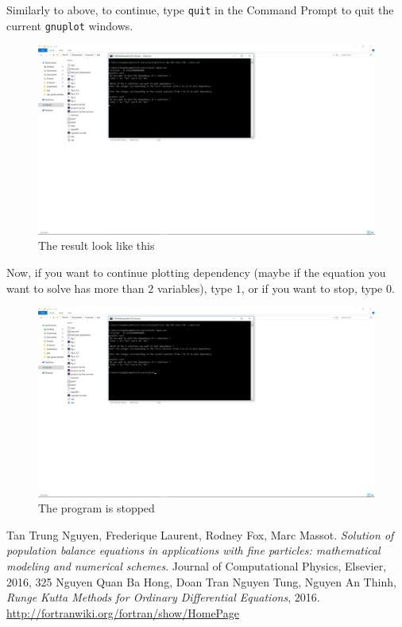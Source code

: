 \documentclass{article}
\begin{document}
	\noindent Similarly to above, to continue, type \texttt{quit} in the Command Prompt to quit the current \texttt{gnuplot} windows.
	\begin{figure}[H]
		\centering	\includegraphics[width=15cm]{fig101}
		\caption{The result look like this}
	\end{figure}
	\noindent Now, if you want to continue plotting dependency (maybe if the equation you want to solve has more than $2$ variables), type $1$, or if you want to stop, type $0$.
	\begin{figure}[H]
		\centering	\includegraphics[width=15cm]{fig11}
		\caption{The program is stopped}
	\end{figure}
\newpage
\begin{thebibliography}{999}
	 Tan Trung Nguyen, Frederique Laurent, Rodney Fox, Marc Massot. \textit{Solution of population balance equations in applications with fine particles: mathematical modeling and numerical schemes}. Journal of Computational Physics, Elsevier, 2016, 325
	 Nguyen Quan Ba Hong, Doan Tran Nguyen Tung, Nguyen An Thinh, \textit{Runge Kutta Methods for Ordinary Differential Equations}, 2016.
	 \url{http://fortranwiki.org/fortran/show/HomePage}
\end{thebibliography}
\end{document}
